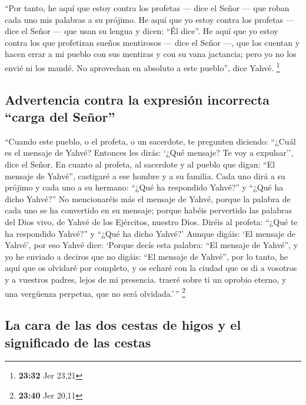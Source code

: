 ``Por tanto, he aquí que estoy contra los profetas ---
dice el Señor --- que roban cada uno mis palabras a su prójimo.
 He aquí que yo estoy contra los profetas --- dice el
Señor --- que usan su lengua y dicen: ``Él dice''.  He
aquí que yo estoy contra los que profetizan sueños mentirosos --- dice
el Señor ---, que los cuentan y hacen errar a mi pueblo con sus mentiras
y con su vana jactancia; pero yo no los envié ni los mandé. No
aprovechan en absoluto a este pueblo'', dice Yahvé. \footnote{\textbf{23:32}
  Jer 23,21}

\hypertarget{advertencia-contra-la-expresiuxf3n-incorrecta-carga-del-seuxf1or}{%
\subsection{Advertencia contra la expresión incorrecta ``carga del
Señor''}\label{advertencia-contra-la-expresiuxf3n-incorrecta-carga-del-seuxf1or}}

 ``Cuando este pueblo, o el profeta, o un sacerdote, te
pregunten diciendo: ``¿Cuál es el mensaje de Yahvé? Entonces les dirás:
`¿Qué mensaje? Te voy a expulsar'', dice el Señor.  En
cuanto al profeta, al sacerdote y al pueblo que digan: ``El mensaje de
Yahvé'', castigaré a ese hombre y a su familia.  Cada uno
dirá a su prójimo y cada uno a su hermano: ``¿Qué ha respondido Yahvé?''
y ``¿Qué ha dicho Yahvé?''  No mencionaréis más el
mensaje de Yahvé, porque la palabra de cada uno se ha convertido en su
mensaje; porque habéis pervertido las palabras del Dios vivo, de Yahvé
de los Ejércitos, nuestro Dios.  Diréis al profeta:
``¿Qué te ha respondido Yahvé?'' y ``¿Qué ha dicho Yahvé?'
 Aunque digáis: `El mensaje de Yahvé', por eso Yahvé
dice: `Porque decís esta palabra: ``El mensaje de Yahvé'', y yo he
enviado a deciros que no digáis: ``El mensaje de Yahvé'',
 por lo tanto, he aquí que os olvidaré por completo, y os
echaré con la ciudad que os di a vosotros y a vuestros padres, lejos de
mi presencia.  traeré sobre ti un oprobio eterno, y una
vergüenza perpetua, que no será olvidada.'\,'' \footnote{\textbf{23:40}
  Jer 20,11}

\hypertarget{la-cara-de-las-dos-cestas-de-higos-y-el-significado-de-las-cestas}{%
\subsection{La cara de las dos cestas de higos y el significado de las
cestas}\label{la-cara-de-las-dos-cestas-de-higos-y-el-significado-de-las-cestas}}

